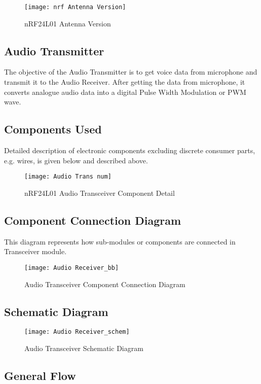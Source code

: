 \begin{figure}[h]
  \centering
  \texttt{[image: nrf Antenna Version]}
  \caption{nRF24L01 Antenna Version}
\end{figure}

\subsection{Audio Transmitter}
The objective of the Audio Transmitter is to get voice data from microphone and transmit it to the Audio Receiver. After getting the data from microphone, it converts analogue audio data into a digital Pulse Width Modulation or PWM wave.

\subsection{Components Used}
Detailed description of electronic components excluding discrete consumer parts, e.g. wires, is given below and described above.

\begin{figure}[h]
  \centering
  \texttt{[image: Audio Trans num]}
  \caption{nRF24L01 Audio Transceiver Component Detail}
\end{figure}

\subsection{Component Connection Diagram}
This diagram represents how sub-modules or components are connected in Transceiver module.


\begin{figure}[h]
  \centering
  \texttt{[image: Audio Receiver\_bb]}
  \caption{Audio Transceiver Component Connection Diagram}
\end{figure}


\subsection{Schematic Diagram}

\begin{figure}[h]
  \centering
  \texttt{[image: Audio Receiver\_schem]}
  \caption{Audio Transceiver Schematic Diagram}
\end{figure}


\subsection{General Flow}

